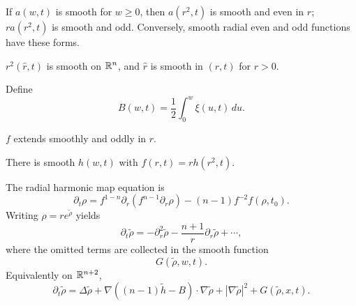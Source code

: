 \begin{lemma}
\label{lem:even-odd-radial-functions}
If $a(w,t)$ is smooth for $w\ge0$, then $a(r^2,t)$ is smooth and even
in $r$; $r a(r^2,t)$ is smooth and odd. Conversely, smooth radial even
and odd functions have these forms.
\end{lemma}

\begin{corollary}
\label{cor:r-squared-smooth-function}
\label{rcor}

$r^2(\hat r,t)$ is smooth on $\mathbb{R}^n$, and $\hat r$ is smooth in $(r,t)$
for $r>0$.
\end{corollary}
Define
\begin{equation}\label{Bdefn}B(w,t)=\frac12\int_0^w\xi(u,t)\,du.\end{equation}

\begin{claim}
\label{claim:f-odd-smooth-function}

$f$ extends smoothly and oddly in $r$.
\end{claim}
\begin{corollary}[Factorization $f(r,t)=r\,h(r^2,t)$]
\label{cor:f-factorization-rh}

There is smooth $h(w,t)$ with $f(r,t)=rh(r^2,t)$.
\end{corollary}

The radial harmonic map equation is
\begin{equation}\label{eqrothar}
\partial_t\rho=f^{1-n}\partial_r(f^{n-1}\partial_r\rho)-(n-1)f^{-2}f(\rho,t_0).
\end{equation}
Writing $\rho=re^{\tilde\rho}$ yields
\begin{equation}\label{newform}
\partial_t\tilde\rho=-\partial_r^2\tilde\rho-\frac{n+1}{r}\partial_r\tilde\rho+\cdots,
\end{equation}
where the omitted terms are collected in the smooth function
\begin{equation}\label{defofG}G(\tilde\rho,w,t).\end{equation}
Equivalently on $\mathbb{R}^{n+2}$,
\begin{equation}\label{betterharMapeq}
\partial_t\tilde\rho=\Delta\tilde\rho+\nabla((n-1)\tilde h-B)\cdot\nabla\tilde\rho+|\nabla\tilde\rho|^2+G(\tilde\rho,x,t).
\end{equation}


